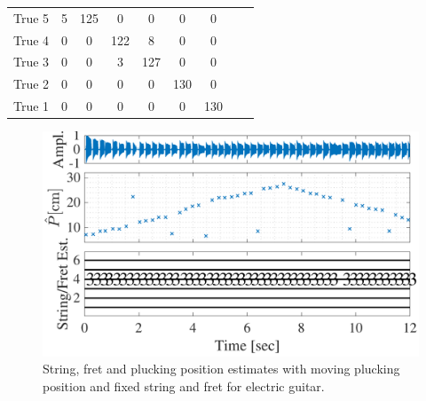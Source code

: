 \documentclass{article}
\begin{document}
\begin{sloppy}
\begin{table}
\begin{tabularx}{0.46\textwidth}{@{}l*{7}{c}c@{}}
True 5   &5  & 125\cellcolor[gray]{.8}   & 0                        &0      &0  &0  \\
True 4   &0  &0  &122 \cellcolor[gray]{.8}                           & 8 &0  &0  \\
True 3   &0  &0  &3                     &127 \cellcolor[gray]{.8}   & 0   &0  \\
True 2   &0  &0  &0  &0                   &130 \cellcolor[gray]{.8}  & 0  \\
True 1   &0  &0  &0  &0                   &0                          &130 \cellcolor[gray]{.8} \\
\bottomrule %
\end{tabularx}
\end{table}
%

\begin{figure}[t]
\centering
   \includegraphics[width=.86\linewidth]{img/tablature_constant_note8}\vspace{-2mm}
   \caption{String, fret and plucking position estimates with moving plucking position and fixed string and fret for electric guitar.}
   \label{fig:pluck_position_fixed_tabs} 
\end{figure}
%

\end{sloppy}
\end{document}
